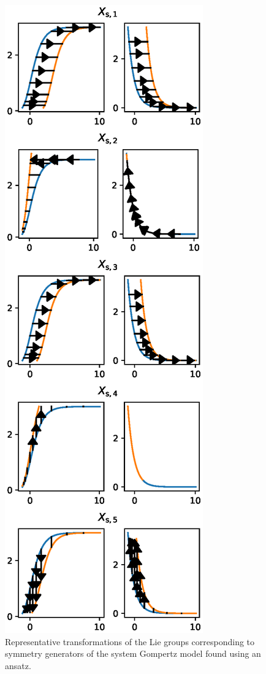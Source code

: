 \begin{figure}
  \centering
  \includegraphics[height=.8\textheight]{images/gompertz-system-ansatz}
  \caption{Representative transformations of the Lie groups corresponding to symmetry generators of the system Gompertz model found using an ansatz.}
  \label{fig:gompertz-system-ansatz}
\end{figure}

